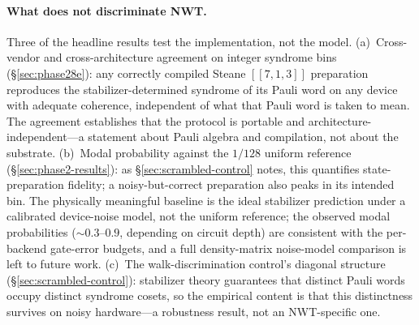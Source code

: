 \documentclass[11pt]{article}
\newcommand{\Klogical}{[[7, 1, 3]]}
\begin{document}
\paragraph{What does not discriminate NWT.}  Three of the headline results test the implementation, not the model.  (a)~Cross-vendor and cross-architecture agreement on integer syndrome bins (\S\ref{sec:phase28e}): any correctly compiled Steane $\Klogical$ preparation reproduces the stabilizer-determined syndrome of its Pauli word on any device with adequate coherence, independent of what that Pauli word is taken to mean.  The agreement establishes that the protocol is portable and architecture-independent---a statement about Pauli algebra and compilation, not about the substrate.  (b)~Modal probability against the $1/128$ uniform reference (\S\ref{sec:phase2-results}): as \S\ref{sec:scrambled-control} notes, this quantifies state-preparation fidelity; a noisy-but-correct preparation also peaks in its intended bin.  The physically meaningful baseline is the ideal stabilizer prediction under a calibrated device-noise model, not the uniform reference; the observed modal probabilities ($\sim 0.3$--$0.9$, depending on circuit depth) are consistent with the per-backend gate-error budgets, and a full density-matrix noise-model comparison is left to future work.  (c)~The walk-discrimination control's diagonal structure (\S\ref{sec:scrambled-control}): stabilizer theory guarantees that distinct Pauli words occupy distinct syndrome cosets, so the empirical content is that this distinctness survives on noisy hardware---a robustness result, not an NWT-specific one.
\end{document}

